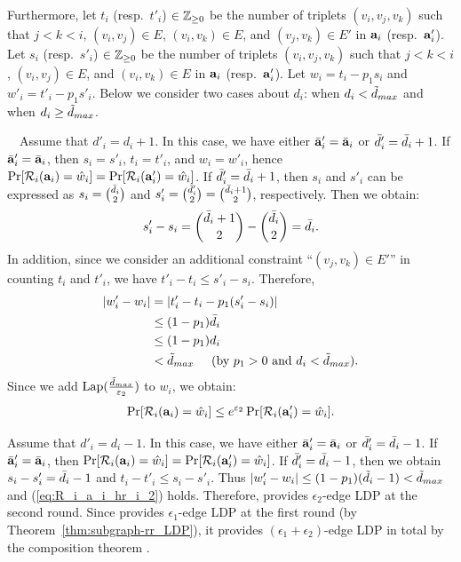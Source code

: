 {Furthermore, 
let $t_i$ (resp.~$t'_i$) $\in \mathbb{Z}_{\ge0}$ be the number of triplets $(v_i, v_j, v_k)$ such that $j < k < i$, $(v_i,v_j) \in E$, $(v_i,v_k) \in E$, and $(v_j,v_k) \in E'$ in $\mathbf{a}_i$ (resp.~$\mathbf{a}'_i$). 
Let $s_i$ (resp.~$s'_i$) $\in \mathbb{Z}_{\ge0}$ be the number of triplets $(v_i, v_j, v_k)$ such that $j < k < i$, $(v_i,v_j) \in E$, and $(v_i,v_k) \in E$ in $\mathbf{a}_i$ (resp.~$\mathbf{a}'_i$). 
Let $w_i = t_i - p_1 s_i$ and $w'_i = t'_i - p_1 s'_i$. 
Below we consider two cases about $d_i$: when $d_i < \tilde{d}_{max}$ and when $d_i \geq \tilde{d}_{max}$. 

\smallskip
{}~~Assume that $d'_i = d_i + 1$. 
In this case, we have either $\bar{\mathbf{a}}'_i = \bar{\mathbf{a}}_i$ or $\bar{d}'_i = \bar{d}_i+1$. 
If $\bar{\mathbf{a}}'_i = \bar{\mathbf{a}}_i$, then $s_i = s'_i$, $t_i = t'_i$, and $w_i = w'_i$, hence $\Pr[\mathcal{R}_i(\mathbf{a}_i) = \hat{w}_i] = \Pr[\mathcal{R}_i(\mathbf{a}'_i) = \hat{w}_i]$. 
If $\bar{d}'_i = \bar{d}_i+1$, then $s_i$ and $s'_i$ can be expressed as $s_i = \binom{\bar{d}_i}{2}$ and $s'_i = \binom{\bar{d}'_i}{2} = \binom{\bar{d}_i+1}{2}$, respectively. 
Then we obtain:
\begin{align*}
s'_i - s_i = \binom{\bar{d}_i+1}{2} - \binom{\bar{d}_i}{2} = \bar{d}_i.
\end{align*}
In addition, since we consider an additional constraint ``$(v_j,v_k) \in E'$'' in counting $t_i$ and $t'_i$, 
we have $t'_i - t_i \leq s'_i - s_i$. 
Therefore, 
\begin{align*}
|w'_i - w_i| 
&= |t'_i - t_i - p_1 (s'_i - s_i)| \\
&\leq (1 - p_1) \bar{d}_i \\
&\leq (1 - p_1) d_i \\
&< \tilde{d}_{max} \hspace{5mm} \text{(by $p_1 > 0$ and $d_i < \tilde{d}_{max}$)}.
\end{align*}
Since we add $\textrm{Lap}(\frac{\tilde{d}_{max}}{\varepsilon_2})$ to $w_i$, we obtain:
\begin{align}
\Pr[\mathcal{R}_i(\mathbf{a}_i) = \hat{w}_i] \leq e^{\varepsilon_2} \Pr[\mathcal{R}_i(\mathbf{a}'_i) = \hat{w}_i]. 
\label{eq:R_i_a_i_hr_i_2}
\end{align}

Assume that $d'_i = d_i - 1$. 
In this case, we have either $\bar{\mathbf{a}}'_i = \bar{\mathbf{a}}_i$ or $\bar{d}'_i = \bar{d}_i-1$. 
If $\bar{\mathbf{a}}'_i = \bar{\mathbf{a}}_i$, then $\Pr[\mathcal{R}_i(\mathbf{a}_i) = \hat{w}_i] = \Pr[\mathcal{R}_i(\mathbf{a}'_i) = \hat{w}_i]$. 
If $\bar{d}'_i = \bar{d}_i-1$, then we obtain $s_i - s'_i = \bar{d}_i - 1$ and $t_i - t'_i \leq s_i - s'_i$. 
Thus $|w'_i - w_i| \leq (1-p_1) (\tilde{d}_i - 1) < \tilde{d}_{max}$ and (\ref{eq:R_i_a_i_hr_i_2}) holds. 
Therefore,  provides $\epsilon_2$-edge LDP at the second round. 
Since  provides $\epsilon_1$-edge LDP at the first round (by Theorem~\ref{thm:subgraph-rr_LDP}), it provides $(\epsilon_1 + \epsilon_2)$-edge LDP in total by the composition theorem \cite{DP}. 

}

